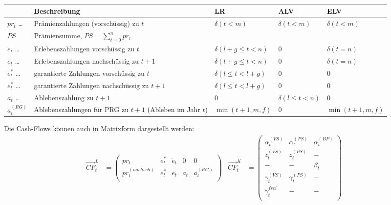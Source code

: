 \documentclass[a4paper,10pt]{article}
\begin{document}
\begin{longtable}{lp{6.5cm}v{2.5cm}v{2.5cm}v{2.5cm}}
& Beschreibung & LR & ALV & ELV \\\hline
$pr_t$  \dots          & Prämienzahlungen (vorschüssig) zu $t$ & $\delta(t<m)$ & $\delta(t<m)$ & $\delta(t<m)$ \\
$PS$                   & Prämiensumme, $PS=\sum_{t=0}^n pr_t$\\[1em]

$\ddot{e}_t$  \dots    & Erlebenszahlungen vorschüssig zu $t$ & $\delta(l+g\le t< n)$ & 0 & $\delta(t=n)$\\
$e_t$  \dots           & Erlebenszahlungen nachschüssig zu $t+1$& $\delta(l+g\le t< n)$ & 0 & $\delta(t=n)$\\
$\ddot{e}_t^{*}$ \dots & garantierte Zahlungen vorschüssig zu $t$ & $\delta(l\le t< l+g)$ & 0 & 0 \\
$e_t^{*}$  \dots       & garantierte Zahlungen nachschüssig zu $t+1$ & $\delta(l\le t< l+g)$ & 0 & 0 \\[1em]

$a_t$  \dots           & Ablebenszahlung zu $t+1$ & 0 & $\delta(l\le t < n)$ & 0 \\
$a_t^{(RG)}$           & Ablebenszahlungen für PRG zu $t+1$ (Ableben im Jahr $t$) & $\min(t+1,m,f)$ & 0 & $\min(t+1,m,f)$ \\

\end{longtable}

Die Cash-Flows können auch in Matrixform dargestellt werden:
\begin{align*}
%
 \overrightarrow{CF}^L_t &= \left(
 \begin{matrix} %
pr_t & \ddot{e}_t^{*} & \ddot{e}_t & 0 & 0 \\
pr^{(nachsch)}_t & e_t^{*} & e_t & a_t & a_t^{(RG)}\\
\end{matrix}
 \right)
% 
&
 \overrightarrow{CF}^K_t &= \left(
 \begin{matrix}
\alpha^{(VS)}_t & \alpha^{(PS)}_t  & \alpha^{(BP)}_t \\
z^{(VS)}_t & z^{(PS)}_t  & -\\
- & - & \beta_t \\
\gamma^{(VS)}_t & \gamma^{(PS)}_t & -\\
\tilde{\gamma}^{frei}_t & - & -\\  
 \end{matrix}
 \right)
\end{align*}
\end{document}
